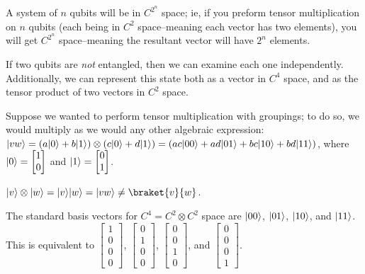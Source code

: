 
\begin{note}
    A system of $n$ qubits will be in $C^{2^n}$ space; ie, if you preform tensor multiplication on $n$ qubits (each being in $C^2$ space–meaning each vector has two elements), you will get $C^{2^n}$ space–meaning the resultant vector will have $2^n$ elements.
\end{note}

\begin{note}
    If two qubits are \emph{not} entangled, then we can examine each one independently. Additionally, we can represent this state both as a vector in $C^4$ space, and as the tensor product of two vectors in $C^2$ space.
\end{note}

Suppose we wanted to perform tensor multiplication with groupings; to do so, we would multiply as we would any other algebraic expression: $\lvert vw\rangle = (a \lvert0\rangle + b \lvert1\rangle) \otimes (c \lvert0\rangle + d \lvert1\rangle) = (ac \lvert00\rangle + ad \lvert01\rangle + bc \lvert10\rangle + bd \lvert11\rangle)$, where $\lvert0\rangle = \begin{bmatrix}
    1\\
    0
\end{bmatrix}$ and $\lvert1\rangle = \begin{bmatrix}
    0\\
    1
\end{bmatrix}$.

\begin{note}
    $\ket{v} \otimes \ket{w} = \ket{v} \ket{w} = \ket{vw} \neq \braket{v}{w}$.
\end{note}

The standard basis vectors for $C^4 = C^2 \otimes C^2$ space are $\lvert00\rangle$, $\lvert01\rangle$, $\lvert10\rangle$, and $\lvert11\rangle$. This is equivalent to $\begin{bmatrix}
    1\\
    0\\
    0\\
    0
\end{bmatrix}$, $\begin{bmatrix}
    0\\
    1\\
    0\\
    0
\end{bmatrix}$, $\begin{bmatrix}
    0\\
    0\\
    1\\
    0
\end{bmatrix}$, and $\begin{bmatrix}
    0\\
    0\\
    0\\
    1
\end{bmatrix}$.

